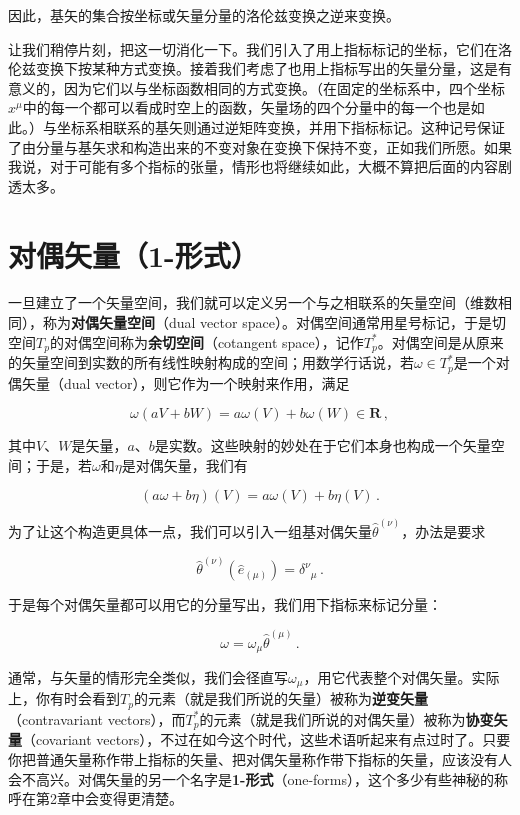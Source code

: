 因此，基矢的集合按坐标或矢量分量的洛伦兹变换之逆来变换。

让我们稍停片刻，把这一切消化一下。我们引入了用上指标标记的坐标，它们在洛伦兹变换下按某种方式变换。接着我们考虑了也用上指标写出的矢量分量，这是有意义的，因为它们以与坐标函数相同的方式变换。（在固定的坐标系中，四个坐标$x^{\mu}$中的每一个都可以看成时空上的函数，矢量场的四个分量中的每一个也是如此。）与坐标系相联系的基矢则通过逆矩阵变换，并用下指标标记。这种记号保证了由分量与基矢求和构造出来的不变对象在变换下保持不变，正如我们所愿。如果我说，对于可能有多个指标的张量，情形也将继续如此，大概不算把后面的内容剧透太多。

\section{对偶矢量（1-形式）}

一旦建立了一个矢量空间，我们就可以定义另一个与之相联系的矢量空间（维数相同），称为\textbf{对偶矢量空间}（dual vector space）。对偶空间通常用星号标记，于是切空间$T_p$的对偶空间称为\textbf{余切空间}（cotangent space），记作$T_p^{*}$。对偶空间是从原来的矢量空间到实数的所有线性映射构成的空间；用数学行话说，若$\omega\in T_p^{*}$是一个对偶矢量（dual vector），则它作为一个映射来作用，满足

\begin{equation*}
\omega(aV+bW)=a\omega(V)+b\omega(W)\in\mathbf{R}\,,
\tag{1.44}
\end{equation*}

其中$V$、$W$是矢量，$a$、$b$是实数。这些映射的妙处在于它们本身也构成一个矢量空间；于是，若$\omega$和$\eta$是对偶矢量，我们有

\begin{equation*}
(a\omega+b\eta)(V)=a\omega(V)+b\eta(V)\,.
\tag{1.45}
\end{equation*}

为了让这个构造更具体一点，我们可以引入一组基对偶矢量$\hat{\theta}^{(\nu)}$，办法是要求

\begin{equation*}
\hat{\theta}^{(\nu)}(\hat{e}_{(\mu)})=\delta^{\nu}{}_{\mu}\,.
\tag{1.46}
\end{equation*}

于是每个对偶矢量都可以用它的分量写出，我们用下指标来标记分量：

\begin{equation*}
\omega=\omega_{\mu}\hat{\theta}^{(\mu)}\,.
\tag{1.47}
\end{equation*}

通常，与矢量的情形完全类似，我们会径直写$\omega_{\mu}$，用它代表整个对偶矢量。实际上，你有时会看到$T_p$的元素（就是我们所说的矢量）被称为\textbf{逆变矢量}（contravariant vectors），而$T_p^{*}$的元素（就是我们所说的对偶矢量）被称为\textbf{协变矢量}（covariant vectors），不过在如今这个时代，这些术语听起来有点过时了。只要你把普通矢量称作带上指标的矢量、把对偶矢量称作带下指标的矢量，应该没有人会不高兴。对偶矢量的另一个名字是\textbf{1-形式}（one-forms），这个多少有些神秘的称呼在第2章中会变得更清楚。

